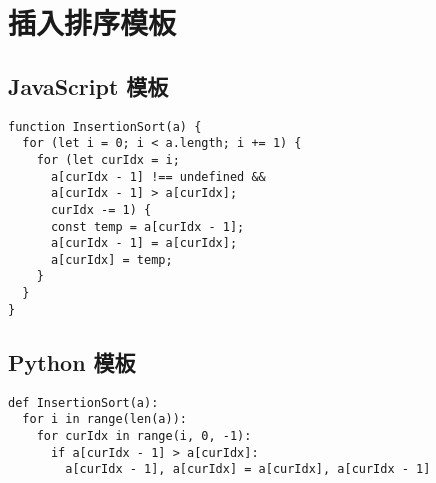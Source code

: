 \newpage
\section{插入排序模板}

\subsection{JavaScript 模板}

\begin{verbatim}
function InsertionSort(a) {
  for (let i = 0; i < a.length; i += 1) {
    for (let curIdx = i;
      a[curIdx - 1] !== undefined &&
      a[curIdx - 1] > a[curIdx];
      curIdx -= 1) {
      const temp = a[curIdx - 1];
      a[curIdx - 1] = a[curIdx];
      a[curIdx] = temp;
    }
  }
}
\end{verbatim}

\subsection{Python 模板}

\begin{verbatim}
def InsertionSort(a):
  for i in range(len(a)):
    for curIdx in range(i, 0, -1):
      if a[curIdx - 1] > a[curIdx]:
        a[curIdx - 1], a[curIdx] = a[curIdx], a[curIdx - 1]
\end{verbatim}
